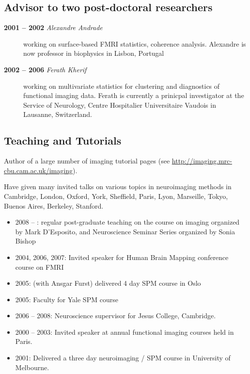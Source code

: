 \documentclass[letterpaper,11pt,openany]{sphinxhowto}
\begin{document}
\subsection{Advisor to two post-doctoral researchers}
\label{research/cv_wrapper:advisor-to-two-post-doctoral-researchers}\begin{description}
\item[{\textbf{2001 – 2002} \emph{Alexandre Andrade}}] \leavevmode
working on surface-based FMRI statistics, coherence analysis.  Alexandre is
now professor in biophysics in Lisbon, Portugal

\item[{\textbf{2002 – 2006} \emph{Ferath Kherif}}] \leavevmode
working on multivariate statistics for clustering and diagnostics of
functional imaging data. Ferath is currently a prinicpal investigator at the
Service of Neurology, Centre Hospitalier Universitaire Vaudois in Lausanne,
Switzerland.

\end{description}


\subsection{Teaching and Tutorials}
\label{research/cv_wrapper:teaching-and-tutorials}
Author of a large number of imaging tutorial pages (see
\href{http://imaging.mrc-cbu.cam.ac.uk/imaging}{http://imaging.mrc-cbu.cam.ac.uk/imaging}).

Have given many invited talks on various topics in neuroimaging methods in
Cambridge, London, Oxford, York, Sheffield, Paris, Lyon, Marseille, Tokyo,
Buenos Aires, Berkeley, Stanford.
\begin{itemize}
\item {} 
2008 – : regular post-graduate teaching on the course on imaging organized by
Mark D'Esposito, and Neuroscience Seminar Series organized by Sonia Bishop

\item {} 
2004, 2006, 2007: Invited speaker for Human Brain Mapping conference course on FMRI

\item {} 
2005: (with Ansgar Furst) delivered 4 day SPM course in Oslo

\item {} 
2005: Faculty for Yale SPM course

\item {} 
2006 – 2008: Neuroscience supervisor for Jesus College, Cambridge.

\item {} 
2000 – 2003: Invited speaker at annual functional imaging courses held in Paris.

\item {} 
2001: Delivered a three day neuroimaging / SPM course in University of Melbourne.

\end{itemize}
\end{document}
